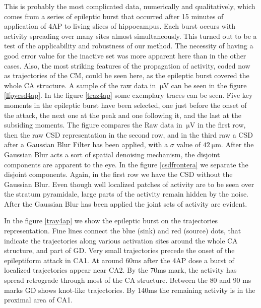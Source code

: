 \documentclass[11pt, letterpaper]{article}
\newcommand{\mum}[1]{\SI{#1}{\micro\metre}}
\newcommand{\muV}[1]{\SI{#1}{\micro\volt}}
\begin{document}
This is probably the most complicated data, 
numerically and qualitatively, which comes from a series of epileptic burst
that occurred after 15 minutes of application of 4AP to living slices of
hippocampus. Each burst occurs with activity spreading over many sites almost
simultaneously. This turned out to be a test of the applicability and
robustness of our method.
The necessity of having a good error value for the inactive set was more apparent here
than in the other cases. Also, the most striking features of the propagation of activity,
coded now as trajectories of the CM, could be seen here, as the epileptic burst covered the whole
CA structure. A sample of the raw data in $\muV{}$ can be seen in the figure \ref{lfpycsd4ap}. In the figure \ref{traz4ap} some exemplary traces
can be seen.
Five key moments in the epileptic burst have been selected, one just before the onset of the attack, the next one at the peak and one  following it, and the last at the subsiding moments. The figure compares the Raw data
in $\muV{}$ in the first row, then the raw CSD representation in the second row, and
in the third raw a CSD after a Gaussian Blur Filter has been applied,
with a $\sigma$ value of $ \mum{42}$. After the Gaussian Blur acts a sort of
spatial denoising mechanism, the disjoint components are apparent to the eye.
In the figure \ref{csdfrontera} we separate the disjoint
components. Again, in the first row we have the CSD without the Gaussian Blur.
Even though well localized patches of activity are to be seen over the
stratum pyramidale, large parts of the activity remain hidden by the noise.
After the Gaussian Blur has been applied the joint sets of activity are evident. 

In the figure \ref{tray4ap} we show the epileptic burst on the trajectories representation.
Fine lines
connect the blue (sink) and red (source) dots, that indicate the trajectories
along various activation
sites around the whole CA structure, and part of GD. Very small trajectories precede
the onset of the epileptiform attack in CA1. At around 60ms after the 4AP dose a burst
of localized trajectories appear near CA2. By the 70ms mark, the activity has spread
retrograde through most of the CA structure. Between the 80 and 90 ms marks
GD shows knot-like trajectories. By 140ms the remaining activity is in the proximal
area of CA1.
\end{document}
